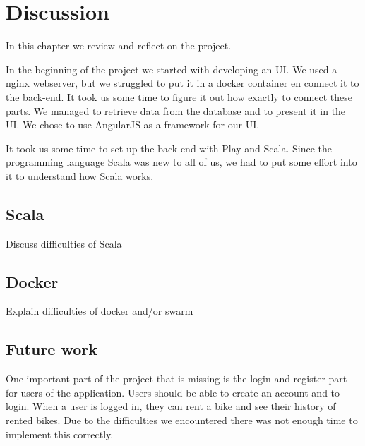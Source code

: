 \section{Discussion}

In this chapter we review and reflect on the project.

In the beginning of the project we started with developing an UI. We used a nginx webserver, but we struggled to put it in a docker container en connect it to the back-end. It took us some time to figure it out how exactly to connect these parts. We managed to retrieve data from the database and to present it in the UI. We chose to use AngularJS as a framework for our UI. 

It took us some time to set up the back-end with Play and Scala. Since the programming language Scala was new to all of us, we had to put some effort into it to understand how Scala works. 

\subsection{Scala}
Discuss difficulties of Scala

\subsection{Docker}
Explain difficulties of docker and/or swarm

\subsection{Future work}
One important part of the project that is missing is the login and register part for users of the application. Users should be able to create an account and to login. When a user is logged in, they can rent a bike and see their history of rented bikes. Due to the difficulties we encountered there was not enough time to implement this correctly. 

